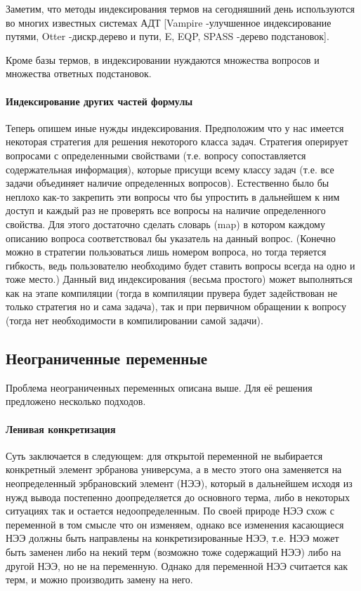 Заметим, что методы индексирования термов на сегодняшний день используются во многих известных системах АДТ [Vampire -улучшенное индексирование путями, Otter -дискр.дерево и пути, E, EQP, SPASS -дерево подстановок].

Кроме базы термов, в индексировании нуждаются множества вопросов и множества ответных подстановок.

\paragraph{Индексирование других частей формулы}
Теперь опишем иные нужды индексирования. Предположим что у нас имеется некоторая стратегия для решения некоторого класса задач. Стратегия оперирует вопросами с определенными свойствами (т.е. вопросу сопоставляется содержательная информация), которые присущи всему классу задач (т.е. все задачи объединяет наличие определенных вопросов).
Естественно было бы неплохо как-то закрепить эти вопросы что бы упростить в дальнейшем к ним доступ и каждый раз не проверять все вопросы на наличие определенного свойства.
Для этого достаточно сделать словарь (map) в котором каждому описанию вопроса соответствовал бы указатель на данный вопрос. (Конечно можно в стратегии пользоваться лишь номером вопроса, но тогда теряется гибкость, ведь пользователю необходимо будет ставить вопросы всегда на одно и тоже место.)
Данный вид индексирования (весьма простого) может выполняться как на этапе компиляции (тогда в компиляции прувера будет задействован не только стратегия но и сама задача), так и при первичном обращении к вопросу (тогда нет необходимости в компилировании самой задачи).


\subsection{Неограниченные переменные}
Проблема неограниченных переменных описана выше. Для её решения предложено несколько подходов.

\paragraph{Ленивая конкретизация}
Суть заключается в следующем: для открытой переменной не выбирается конкретный элемент эрбранова универсума, а в место этого она заменяется на неопределенный эрбрановский элемент (НЭЭ), который в дальнейшем исходя из нужд вывода постепенно доопределяется до основного терма, либо в некоторых ситуациях так и остается недоопределенным.
По своей природе НЭЭ схож с переменной в том смысле что он изменяем, однако все изменения касающиеся НЭЭ должны быть направлены на конкретизированные НЭЭ, т.е. НЭЭ может быть заменен либо на некий терм (возможно тоже содержащий НЭЭ) либо на другой НЭЭ, но не на переменную. Однако для переменной НЭЭ считается как терм, и можно производить замену на него.


